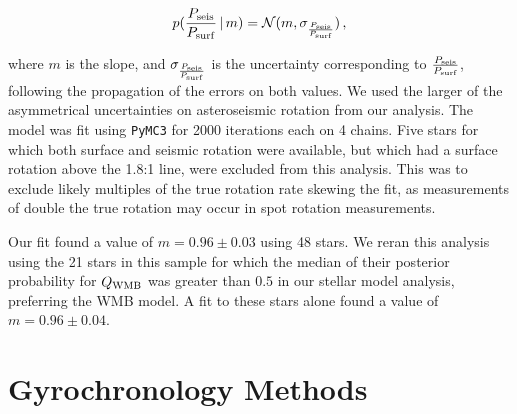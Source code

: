 \begin{equation}
	p(\frac{P_{\rm seis}}{P_{\rm surf}}\, |\, m) = \mathcal{N}(m, \sigma_\frac{P_{\rm seis}}{P_{\rm surf}})\, ,
\end{equation}

\noindent where $m$ is the slope, and $\sigma_\frac{P_{\rm seis}}{P_{\rm surf}}$ is the uncertainty corresponding to $\frac{P_{\rm seis}}{P_{\rm surf}}$, following the propagation of the errors on both values. We used the larger of the asymmetrical uncertainties on asteroseismic rotation from our analysis. The model was fit using \texttt{PyMC3} for 2000 iterations each on 4 chains. Five stars for which both surface and seismic rotation were available, but which had a surface rotation above the 1.8:1 line, were excluded from this analysis. This was to exclude likely multiples of the true rotation rate skewing the fit, as measurements of double the true rotation may occur in spot rotation measurements.

Our fit found a value of $m = 0.96 \pm 0.03$ using 48 stars. We reran this analysis using the 21 stars in this sample for which the median of their posterior probability for $Q_{\rm WMB}$ was greater than $0.5$ in our stellar model analysis, preferring the WMB model. A fit to these stars alone found a value of $m = 0.96 \pm 0.04$.

\section{Gyrochronology Methods}\label{s:gyro}
